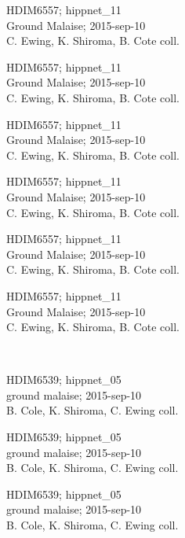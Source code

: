 \documentclass[2pt]{extarticle}
\begin{document}
\noindent
\parbox{0.16\textwidth}{\tiny \raggedright \rule[-0.3\baselineskip]{0pt}{10pt}HDIM6557; hippnet\_11\\ Ground Malaise; 2015-sep-10\\ C. Ewing, K. Shiroma, B. Cote coll.}
\parbox{0.16\textwidth}{\tiny \raggedright \rule[-0.3\baselineskip]{0pt}{10pt}HDIM6557; hippnet\_11\\ Ground Malaise; 2015-sep-10\\ C. Ewing, K. Shiroma, B. Cote coll.}
\parbox{0.16\textwidth}{\tiny \raggedright \rule[-0.3\baselineskip]{0pt}{10pt}HDIM6557; hippnet\_11\\ Ground Malaise; 2015-sep-10\\ C. Ewing, K. Shiroma, B. Cote coll.}
\parbox{0.16\textwidth}{\tiny \raggedright \rule[-0.3\baselineskip]{0pt}{10pt}HDIM6557; hippnet\_11\\ Ground Malaise; 2015-sep-10\\ C. Ewing, K. Shiroma, B. Cote coll.}
\parbox{0.16\textwidth}{\tiny \raggedright \rule[-0.3\baselineskip]{0pt}{10pt}HDIM6557; hippnet\_11\\ Ground Malaise; 2015-sep-10\\ C. Ewing, K. Shiroma, B. Cote coll.}
\parbox{0.16\textwidth}{\tiny \raggedright \rule[-0.3\baselineskip]{0pt}{10pt}HDIM6557; hippnet\_11\\ Ground Malaise; 2015-sep-10\\ C. Ewing, K. Shiroma, B. Cote coll.} \\ 
\vspace{0.001in} 

\noindent
\parbox{0.16\textwidth}{\tiny \raggedright \rule[-0.3\baselineskip]{0pt}{10pt}HDIM6539; hippnet\_05\\ ground malaise; 2015-sep-10\\ B. Cole, K. Shiroma, C. Ewing coll.}
\parbox{0.16\textwidth}{\tiny \raggedright \rule[-0.3\baselineskip]{0pt}{10pt}HDIM6539; hippnet\_05\\ ground malaise; 2015-sep-10\\ B. Cole, K. Shiroma, C. Ewing coll.}
\parbox{0.16\textwidth}{\tiny \raggedright \rule[-0.3\baselineskip]{0pt}{10pt}HDIM6539; hippnet\_05\\ ground malaise; 2015-sep-10\\ B. Cole, K. Shiroma, C. Ewing coll.}
\end{document}
